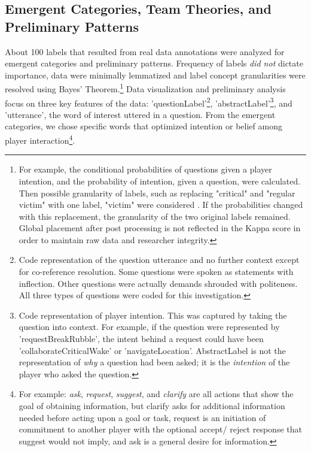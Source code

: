 \subsection{Emergent Categories, Team Theories, and Preliminary Patterns}

About 100 labels that resulted from real data annotations were analyzed for emergent categories and preliminary patterns. Frequency of labels \emph{did not} dictate importance, data were minimally lemmatized and label concept granularities were resolved using Bayes' Theorem.\footnote{For example, the conditional probabilities of questions given a player intention,  and the probability of intention, given a question, were calculated. Then possible granularity of labels, such as replacing "critical" and "regular victim" with one label, "victim" were considered . If the probabilities changed with this replacement, the granularity of the two original labels remained. Global placement after post processing is not reflected in the Kappa score in order to maintain raw data and researcher integrity.} Data visualization and preliminary analysis focus on three key features of the data: 'questionLabel'\footnote{Code representation of the question utterance and no further context except for co-reference resolution. Some questions were spoken as statements with inflection. Other questions were actually demands shrouded with politeness. All three types of questions were coded for this investigation.}, 'abstractLabel'\footnote{Code representation of player intention. This was captured by taking the question into context. For example, if the question were represented by 'requestBreakRubble', the intent behind a request could have been 'collaborateCriticalWake' or 'navigateLocation'. AbstractLabel is not the representation of \emph{why} a question had been asked; it is the \emph{intention} of the player who asked the question.}, and 'utterance', the word of interest uttered in a question. From the emergent categories, we chose specific words that optimized intention or belief among player interaction\footnote{For example: \emph{ask}, \emph{request}, \emph{suggest}, and \emph{clarify} are all actions that show the goal of obtaining information, but clarify asks for additional information needed before acting upon a goal or task, request is an initiation of commitment to another player with the optional accept/ reject response that suggest would not imply, and ask is a general desire for information.}. 

